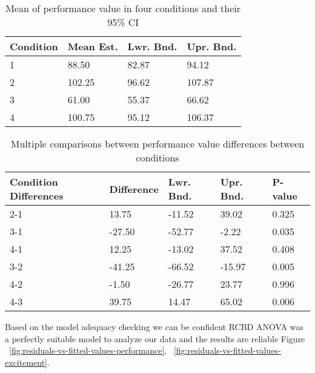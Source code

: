 \documentclass[conference]{IEEEtran}
\begin{document}
\begin{table}[h]
\caption{Mean of performance value in four conditions and their 95\% CI}
\label{tbl:mean-cnd-perf}
\centering
\begin{tabular}{llll}
\hline
Condition      &   Mean Est.      &   Lwr. Bnd.    &  Upr. Bnd.     \\
\hline
1              &   88.50          &   82.87        &  94.12         \\
2              &   102.25         &   96.62        &  107.87        \\
3              &   61.00          &   55.37        &  66.62         \\
4              &   100.75         &   95.12        &  106.37        \\
\hline
\end{tabular}
\end{table}

\begin{table}[h]
\caption{Multiple comparisons between performance value differences between conditions}
\label{tbl:pval-cnd-perf}
\centering
\begin{tabular}{lllll}
\hline
Condition \newline
Differences &   Difference  &   Lwr. Bnd.      &     Upr. Bnd.   &  P-value     \\
\hline
2-1         &    13.75      &     -11.52       &      39.02      &  0.325       \\
3-1         &   -27.50      &     -52.77       &      -2.22      &  0.035       \\
4-1         &    12.25      &     -13.02       &      37.52      &  0.408       \\
3-2         &   -41.25      &     -66.52       &     -15.97      &  0.005       \\
4-2         &    -1.50      &     -26.77       &      23.77      &  0.996       \\
4-3         &    39.75      &     14.47        &      65.02      &  0.006       \\
\hline
\end{tabular}
\end{table}

Based on the model adequacy checking we can be confident RCBD ANOVA was a perfectly suitable model to analyze our data and the results are reliable Figure ~\ref{fig:residuals-vs-fitted-values-performance}, ~\ref{fig:residuals-vs-fitted-values-excitement}.
\end{document}

